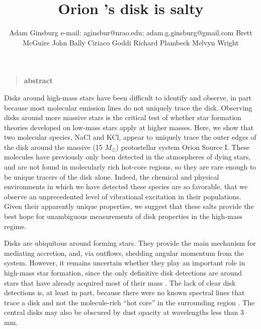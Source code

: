 \documentclass[12pt]{article}
\date{}
\author{Adam Ginsburg 
e-mail: aginsbur@nrao.edu; adam.g.ginsburg@gmail.com
Brett McGuire
John Bally
Ciriaco Goddi
Richard Plambeck
Melvyn Wright
}
\title{Orion \sourcei's disk is salty}
\newenvironment{sciabstract}{%
\begin{quote} \bf  }
{\end{quote}}
\newcommand{\msun}{\ensuremath{M_{\odot}}\xspace}			%
\begin{document}


\maketitle

\begin{sciabstract}
    abstract
\end{sciabstract}




Disks around high-mass stars have been difficult to identify and observe, in
part because most molecular emission lines do not uniquely trace the disk.
Observing disks around more massive stars is the critical test of whether star
formation theories developed on low-mass stars apply at higher masses.  Here,
we show that two molecular species, NaCl and KCl, appear to uniquely trace the
outer edges of the disk around the massive (15 \msun) protostellar system Orion
Source I. These molecules have previously only been detected in the atmospheres
of dying stars, and are not found in molecularly rich hot-core regions, so they
are rare enough to be unique tracers of the disk alone.  Indeed, the chemical
and physical environments in which we have detected these species are so
favorable, that we observe an unprecedented level of vibrational excitation in
their populations.    Given their apparently unique properties, we suggest that
these salts provide the best hope for unambiguous measurements of disk
properties in the high-mass regime.

Disks are ubiquitous around forming stars.  They provide the main mechanism for
mediating accretion, and, via outflows, shedding angular momentum from the system.
However, it remains uncertain whether they play an important role in high-mass
star formation, since the only definitive disk detections are around stars that
have already acquired most of their mass \cite{Girart2017a,Ginsburg2018b}.
The lack of clear disk detections is, at least in part, because there were no
known spectral lines that trace a disk and not the molecule-rich ``hot core''
in the surrounding region \cite{Goddi2018a,Cesaroni2017a}.  The central disks
may also be obscured by dust opacity at wavelengths less than 3 mm.
\end{document}
